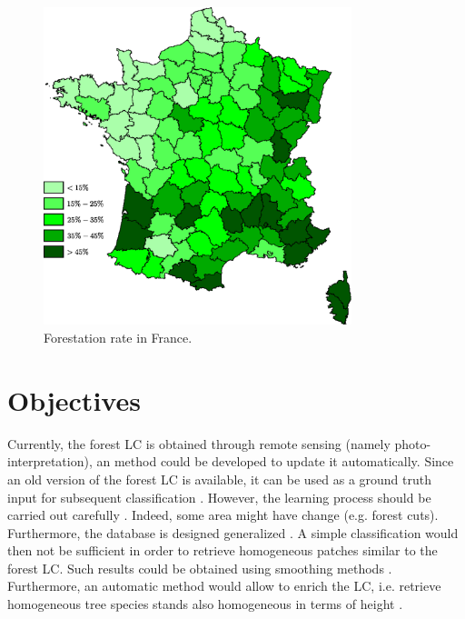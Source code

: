 \begin{figure}
\begin{center}
\includegraphics[width=0.8\textwidth]{Figures/boisement}
\end{center}
\caption{Forestation rate in France.}
\label{fig:forestation}
\end{figure}

\section{Objectives}
Currently, the forest LC is obtained through remote sensing (namely photo-inter\-pretation), an method could be developed to update it automatically. Since an old version of the forest LC is available, it can be used as a ground truth input for subsequent classification \citep{gressin2013updating}. However, the learning process should be carried out carefully \citep{gressin2014updating}. Indeed, some area might have change (e.g. forest cuts). Furthermore, the database is designed generalized \citep{smith1977database}. A simple classification would then not be sufficient in order to retrieve homogeneous patches similar to the forest LC. Such results could be obtained using smoothing methods \citep{schindler2012overview}. Furthermore, an automatic method would allow to enrich the LC, i.e. retrieve homogeneous tree species stands also homogeneous in terms of height \citep{gressin2014unified}.

